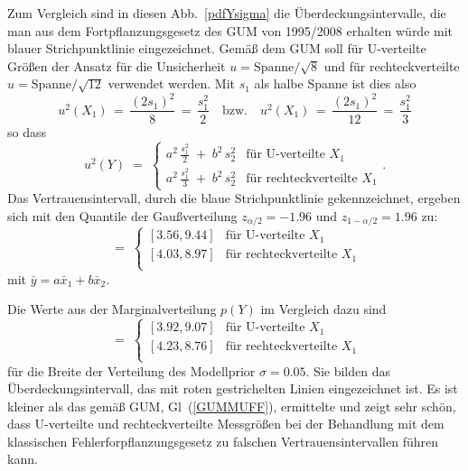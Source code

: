 Zum Vergleich sind in diesen Abb.~\ref{pdfYsigma} die Überdeckungsintervalle, die
man aus dem Fortpflanzungsgesetz des GUM von 1995/2008 erhalten würde mit blauer
Strichpunktlinie eingezeichnet. Gemäß dem GUM soll für U-verteilte
Größen der Ansatz für die Unsicherheit $u = \mathrm{Spanne}/\sqrt{8}$ und für
rechteckverteilte
$u = \mathrm{Spanne}/\sqrt{12}$ verwendet werden. Mit $s_1$ als halbe Spanne ist dies
also
\begin{equation}
u^2(X_1) \, = \, \frac{(2 s_1)^2}{8} \, = \, \frac{s_1^2}{2} \quad \text{bzw.}
\quad u^2(X_1) \, = \, \frac{(2 s_1)^2}{12} \, = \, \frac{s_1^2}{3}
\end{equation}
so dass
\begin{equation}
\renewcommand{\arraystretch}{1.3}
u^2(Y) \; = \; \left\{\begin{array}{ll}
a^2 \, \frac{s_1^2}{2} \; + \; b^2 \, s_2^2 & \text{für U-verteilte~} X_1\\
a^2 \, \frac{s_1^2}{3} \; + \; b^2 \, s_2^2 & \text{für rechteckverteilte~} X_1
\end{array}\right. .
\label{GUMMUFF}
\end{equation}
Das Vertrauensintervall, durch die blaue Strichpunktlinie gekennzeichnet, ergeben sich mit den Quantile der Gaußverteilung $z_{\alpha/2} = -1.96$ und $z_{1-\alpha/2} = 1.96$ zu:
\begin{equation}
[\bar y \; - \; 1.96 \, u(Y), \; \bar y \; + \; 1.96 \, u(Y)]
\; = \; \left\{\begin{array}{ll}
[3.56, 9.44] & \text{für U-verteilte~} X_1\\
\left[4.03, 8.97\right] & \text{für rechteckverteilte~} X_1\\
\end{array}\right.
\end{equation}
mit $\bar y = a \bar x_1 + b \bar x_2$.

Die Werte aus der Marginalverteilung $p(Y)$ im Vergleich dazu sind
\begin{equation}
[P^{-1}(\alpha/2), \; P^{-1}(1 - \alpha/2)]
\; = \; \left\{\begin{array}{ll}
[3.92, 9.07] & \text{für U-verteilte~} X_1\\
\left[4.23, 8.76\right] & \text{für rechteckverteilte~} X_1\\
\end{array}\right.
\end{equation}
für die Breite der Verteilung des Modellprior $\sigma = 0.05$. Sie bilden das
Überdeckungsintervall, das mit roten gestrichelten Linien eingezeichnet ist. Es ist kleiner als das gemäß GUM, Gl~(\ref{GUMMUFF}), ermittelte und zeigt sehr schön, dass
U-verteilte und rechteckverteilte Messgrößen bei der Behandlung mit dem klassischen
Fehlerforpflanzungsgesetz zu falschen Vertrauensintervallen führen kann.

